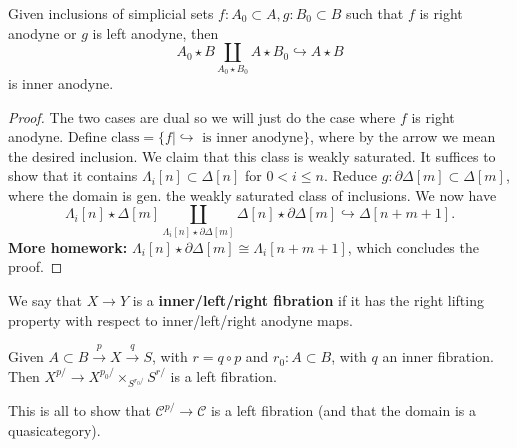\documentclass{amsart}
\begin{document}
\begin{lemma}
    Given inclusions of simplicial sets $f:A_0\subset A, g:B_0\subset B$ such that
    $f$ is right anodyne or $g$ is left anodyne, then
    \begin{equation*}
        A_0\star B \coprod_{A_0\star B_0} A\star B_0\hookrightarrow A\star B
    \end{equation*}
    is inner anodyne.
\end{lemma}
\begin{proof}
    The two cases are dual so we will just do the case where $f$ is right anodyne.
    Define $\text{class}=\{f \mid \hookrightarrow \text{ is inner anodyne}\}$, where
    by the arrow we mean the desired inclusion. We claim that this class is weakly
    saturated. It suffices to show that it contains $\Lambda_i[n]\subset\Delta[n]$
    for $0 < i \leqslant n$. Reduce $g: \partial\Delta[m]\subset \Delta[m]$,
    where the domain is gen. the weakly saturated class of inclusions.
    We now have
    \begin{equation*}
        \Lambda_i[n]\star \Delta[m] \coprod_{\Lambda_i[n]\star\partial\Delta[m]}\Delta[n]\star \partial\Delta[m]\hookrightarrow \Delta[n+m+1].
    \end{equation*}
    \textbf{More homework:} $\Lambda_i[n]\star\partial\Delta[m]\cong \Lambda_i[n+m+1]$, which
    concludes the proof.
\end{proof}

\begin{definition}
    We say that $X\to Y$ is a \textbf{inner/left/right fibration} if it has the right
    lifting property with respect to inner/left/right anodyne maps.
\end{definition}

\begin{proposition}
    Given $A\subset B\xrightarrow{p} X\xrightarrow{q} S$, with $r=q\circ p$ and $r_0:A\subset B$,
    with $q$ an inner fibration. Then $X^{p/}\to X^{p_0/}\times_{S^{r_0/}}S^{r/}$ is a left fibration.
\end{proposition}

This is all to show that $\mathcal{C}^{p/}\to \mathcal{C}$ is a left fibration (and that the domain
is a quasicategory).
\end{document}
